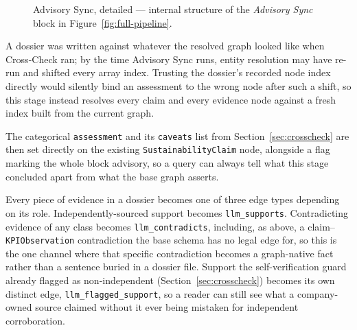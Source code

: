 \documentclass[fontsize=12pt,oneside,headings=small]{scrreprt}
\begin{document}
\begin{figure}[H]
{%
  }
  \caption[Advisory Sync, detailed]{Advisory Sync, detailed --- internal
    structure of the \emph{Advisory Sync} block in Figure~\ref{fig:full-pipeline}.}
  \label{fig:advisory-sync-detail}
\end{figure}

A dossier was written against whatever the resolved graph looked like when Cross-Check ran; by the time Advisory Sync runs, entity resolution may have re-run and shifted every array index. Trusting the dossier's recorded node index directly would silently bind an assessment to the wrong node after such a shift, so this stage instead resolves every claim and every evidence node against a fresh index built from the current graph.

The categorical \texttt{assessment} and its \texttt{caveats} list from Section~\ref{sec:crosscheck} are then set directly on the existing \texttt{SustainabilityClaim} node, alongside a flag marking the whole block advisory, so a query can always tell what this stage concluded apart from what the base graph asserts.

Every piece of evidence in a dossier becomes one of three edge types depending on its role. Independently-sourced support becomes \texttt{llm\_supports}. Contradicting evidence of any class becomes \texttt{llm\_contradicts}, including, as above, a claim--\texttt{KPIObservation} contradiction the base schema has no legal edge for, so this is the one channel where that specific contradiction becomes a graph-native fact rather than a sentence buried in a dossier file. Support the self-verification guard already flagged as non-independent (Section~\ref{sec:crosscheck}) becomes its own distinct edge, \texttt{llm\_flagged\_support}, so a reader can still see what a company-owned source claimed without it ever being mistaken for independent corroboration.
\end{document}
